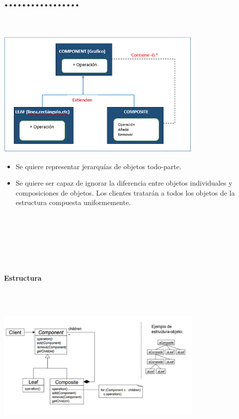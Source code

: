\section{.................} 

\textbf{}\\


\begin{flushleft}

\begin{center}
	\includegraphics[width=10cm]{./Imagenes/composite1} 
	\end{center}
\begin{itemize}
\textbf{Uso}

\textbf{}\\
\textbf{Aplicación}


Usar el patrón COMPOSITE cuando:


  \item Se quiere representar jerarquías de objetos todo-parte.
  \item Se quiere ser capaz de ignorar la diferencia entre objetos individuales y composiciones de objetos.  Los clientes tratarán a todos los objetos de la estructura compuesta uniformemente.

\end{itemize} 

\textbf{}\\
\textbf{}\\
\textbf{}\\
\textbf{}\\
\textbf{}\\
\textbf{}\\
\textbf{Estructura}

\textbf{}\\ 
\textbf{}\\ 

\begin{center}
	\includegraphics[width=10cm]{./Imagenes/composite2} 
	\end{center}


\end{flushleft}
